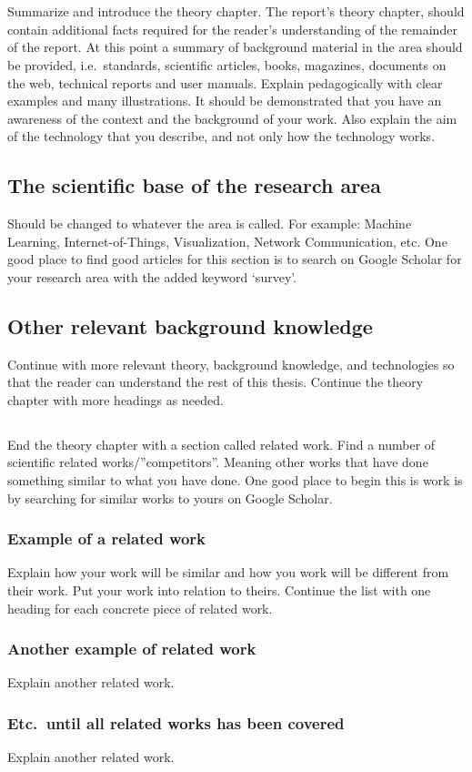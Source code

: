 \section{}\label{sec:theory} 
Summarize and introduce the theory chapter. The report's theory chapter, should
contain additional facts required for the reader's understanding of the
remainder of the report. At this point a summary of background material in the
area should be provided, i.e.\ standards, scientific articles, books, magazines,
documents on the web, technical reports and user manuals. Explain pedagogically
with clear examples and many illustrations. It should be demonstrated that you
have an awareness of the context and the background of your work. Also explain
the aim of the technology that you describe, and not only how the technology
works.

\subsection{The scientific base of the research area}\label{subsec:sciencebase}
Should be changed to whatever the area is called. For example: Machine Learning,
Internet-of-Things, Visualization, Network Communication, etc. One good place to
find good articles for this section is to search on Google Scholar for your
research area with the added keyword ‘survey’.

\subsection{Other relevant background knowledge}\label{subsec:other}
Continue with more relevant theory, background knowledge, and technologies so
that the reader can understand the rest of this thesis.  Continue the theory
chapter with more headings as needed.

\subsection{}\label{subsec:relatedwork} 
End the theory chapter with a section called related work. Find a number of
scientific related works/”competitors”. Meaning other works that have done
something similar to what you have done. One good place to begin this is work is
by searching for similar works to yours on Google Scholar.

\subsubsection{Example of a related work}\label{subsubsec:examplerelatedwork}
Explain how your work will be similar and how you work will be different from
their work. Put your work into relation to theirs.  Continue the list with one
heading for each concrete piece of related work.

\subsubsection{Another example of related work}\label{subsubsec:anotherexample}
Explain another related work.

\subsubsection{Etc.\ until all related works has been covered}\label{subsubsec:etc}
Explain another related work.
